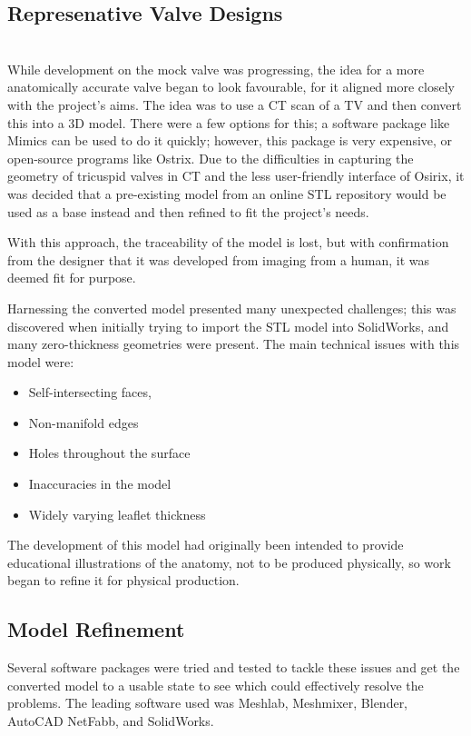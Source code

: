 \subsection{Represenative Valve Designs}

\\
While development on the mock valve was progressing, the idea for a more anatomically accurate valve began to look favourable, for it aligned more closely with the project's aims. The idea was to use a \gls{CT} scan of a \gls{TV} and then convert this into a 3D model. There were a few options for this; a software package like Mimics can be used to do it quickly; however, this package is very expensive, or open-source programs like Ostrix. Due to the difficulties in capturing the geometry of tricuspid valves in \gls{CT} and the less user-friendly interface of Osirix, it was decided that a pre-existing model from an online STL repository would be used as a base instead and then refined to fit the project's needs.

With this approach, the traceability of the model is lost, but with confirmation from the designer that it was developed from imaging from a human, it was deemed fit for purpose.

\mynewline
Harnessing the converted model presented many unexpected challenges; this was discovered when initially trying to import the STL model into SolidWorks, and many zero-thickness geometries were present. The main technical issues with this model were:
\begin{itemize}
    \item Self-intersecting faces,
    \item Non-manifold edges
    \item Holes throughout the surface
    \item Inaccuracies in the model
    \item Widely varying leaflet thickness
\end{itemize}
The development of this model had originally been intended to provide educational illustrations of the anatomy, not to be produced physically, so work began to refine it for physical production.

\subsection{Model Refinement}
Several software packages were tried and tested to tackle these issues and get the converted model to a usable state to see which could effectively resolve the problems. The leading software used was Meshlab, Meshmixer, Blender, AutoCAD NetFabb, and SolidWorks.

